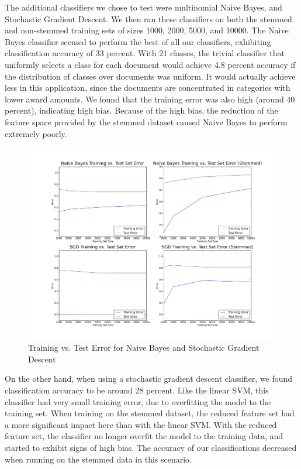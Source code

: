\documentclass{sig-alternate}
\begin{document}
The additional classifiers we chose to test were multinomial Naive Bayes, and Stochastic Gradient Descent.  We then ran these classifiers on both the stemmed and non-stemmed training sets of sizes 1000, 2000, 5000, and 10000.  The Naive Bayes classifier seemed to perform the best of all our classifiers, exhibiting classification accuracy of 33 percent.  With 21 classes, the trivial classifier that uniformly selects a class for each document would achieve 4.8 percent accuracy if the distribution of classes over documents was uniform.  It would actually achieve less in this application, since the documents are concentrated in categories with lower award amounts.  We found that the training error was also high (around 40 percent), indicating high bias.  Because of the high bias, the reduction of the feature space provided by the stemmed dataset caused Naive Bayes to perform extremely poorly. \\

\begin{figure}[h]
\centering
\includegraphics[width=150mm]{other_train_vs_test_both.png}
\caption{Training vs. Test Error for Naive Bayes and Stochastic Gradient Descent}
\end{figure}

On the other hand, when using a stochastic gradient descent classifier, we found classification accuracy to be around 28 percent.  Like the linear SVM, this classifier had very small training error, due to overfitting the model to the training set.  When training on the stemmed dataset, the reduced feature set had a more significant impact here than with the linear SVM.  With the reduced feature set, the classifier no longer overfit the model to the training data, and started to exhibit signs of high bias.  The accuracy of our classifications decreased when running on the stemmed data in this scenario.
\end{document}
